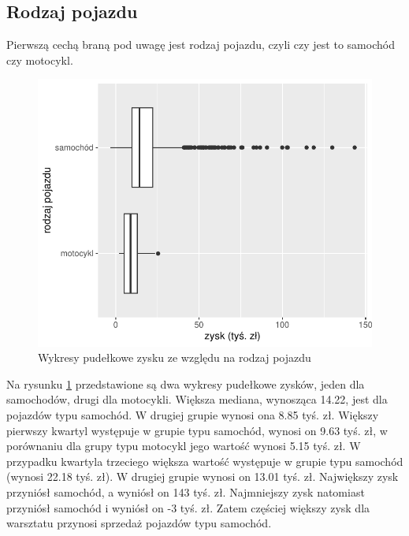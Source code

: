 \documentclass{article}\usepackage[]{graphicx}\usepackage[]{xcolor}
\makeatletter
\def\maxwidth{ %
  \ifdim\Gin@nat@width>\linewidth
    \linewidth
  \else
    \Gin@nat@width
  \fi
}
\newenvironment{knitrout}{}{} %
\makeatother
\begin{document}
\subsection{Rodzaj pojazdu}

Pierwszą cechą braną pod uwagę jest rodzaj pojazdu, czyli czy jest to samochód czy motocykl.

\begin{knitrout}
\color{fgcolor}\begin{figure}[H]

{\centering \includegraphics[width=\maxwidth]{figure/fig_typ-1} 

}

\caption[Wykresy pudełkowe zysku ze względu na rodzaj pojazdu]{Wykresy pudełkowe zysku ze względu na rodzaj pojazdu}\label{fig:fig_typ}
\end{figure}

\end{knitrout}

Na rysunku \ref{fig:fig_typ} przedstawione są dwa wykresy pudełkowe zysków, jeden dla samochodów, drugi dla motocykli. Większa mediana, wynosząca 14.22, jest dla pojazdów typu samochód. W drugiej grupie wynosi ona 8.85 tyś. zł. 
Większy pierwszy kwartyl występuje w grupie typu samochód, wynosi on 9.63 tyś. zł, w porównaniu dla grupy typu motocykl jego wartość wynosi 5.15 tyś. zł.
W przypadku kwartyla trzeciego większa wartość występuje w grupie typu samochód (wynosi 22.18 tyś. zł). W drugiej grupie wynosi on 13.01 tyś. zł.
Największy zysk przyniósł samochód, a wyniósł on 143 tyś. zł. 
Najmniejszy zysk natomiast przyniósł samochód i wyniósł on -3 tyś. zł. Zatem częściej większy zysk dla warsztatu przynosi sprzedaż pojazdów typu samochód. 
\end{document}
